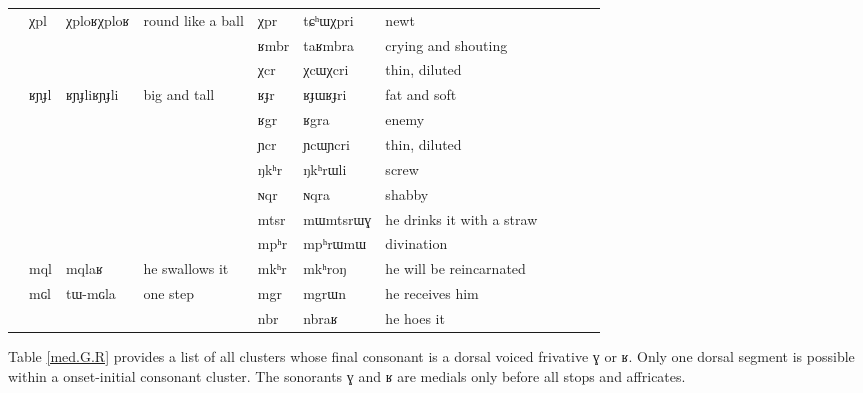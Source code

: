 \documentclass[oldfontcommands,oneside,a4paper,11pt]{article}
\newcommand{\ipa}[1]{{\phon #1}} %
\newcommand{\tib}[1]{\cellcolor{lightgray}\textbf{#1}}
\newcommand{\idph}[1]{\cellcolor{gray}\textbf{#1}}
\begin{document}
\begin{table}
{\begin{tabular}{l|lll|lll|lll|l}
	\midrule	
&		\ipa{χpl} \idph{}&	\ipa{χploʁχploʁ}  &	round like a ball&	\ipa{χpr}  & 	\ipa{tɕʰɯχpri}  & 	newt	\\
&	&	&	&	\ipa{ʁmbr}  & 	\ipa{taʁmbra}  & 	crying and shouting	\\
&	&	&	&	\ipa{χcr} \idph{} & 	\ipa{χcɯχcri}  & 	thin, diluted 	\\
&	\ipa{ʁɲɟl}  \idph{}& 	\ipa{ʁɲɟliʁɲɟli}  & big and tall	&	\ipa{ʁɟr}  \idph{}& 	\ipa{ʁɟɯʁɟri}  & 	fat and soft	\\
&	&	&	&	\ipa{ʁgr} \tib{}  & 	\ipa{ʁgra}  & 	enemy	\\
\midrule
&	&	&	&	\ipa{ɲcr} \idph{} & 	\ipa{ɲcɯɲcri}  &thin, diluted 	\\	
&	&	&	&	\ipa{ŋkʰr}  & 	\ipa{ŋkʰrɯli}  &screw 	\\	
&	&	&	&	\ipa{ɴqr}  & 	\ipa{ɴqra}  & shabby	\\	
\midrule
&	&	&	&	\ipa{mtsr}  & 	\ipa{mɯmtsrɯɣ}  &he drinks it with a straw 	\\	
&	&	&	&	\ipa{mpʰr}  & 	\ipa{mpʰrɯmɯ}  & divination	\\	
&	\ipa{mql}  & 	\ipa{mqlaʁ}  & he swallows it	&	\ipa{mkʰr}  & 	\ipa{mkʰroŋ}  &he will be reincarnated 	\\	
&	\ipa{mɢl}  & 	\ipa{tɯ-mɢla}  & one step	&	\ipa{mgr}  & 	\ipa{mgrɯn}  & he receives him	\\	
\midrule
&	&	&	&	\ipa{nbr}  & 	\ipa{nbraʁ}  &he hoes it 	\\	
\end{tabular}}
\end{table}	
						
		Table  \ref{med.G.R} provides a  list of all clusters whose final consonant is a dorsal voiced frivative  \ipa{ɣ} or \ipa{ʁ}.  Only one dorsal segment is possible within a onset-initial consonant cluster. The sonorants \ipa{ɣ} and \ipa{ʁ} are medials only before all stops and affricates.
						
\end{document}
